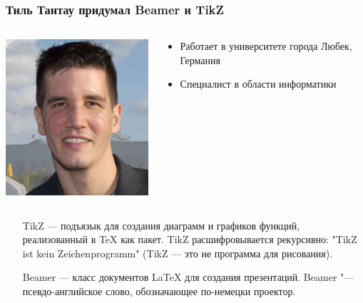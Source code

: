 \documentclass[10pt,pdf,hyperref={unicode}]{beamer}
\begin{document}
\begin{frame}
    \frametitle{Тиль Тантау придумал Beamer и TikZ}
    \begin{columns}[c]
        \begin{column}{0.5\textwidth}
            \includegraphics[keepaspectratio,height=0.5\textheight]{till_tantau.jpg}
        \end{column}
        \begin{column}{0.5\textwidth}
            \begin{itemize}
                \item Работает в университете города Любек, Германия
                \item Специалист в области информатики  
            \end{itemize}
        \end{column}
    \end{columns}
    \vfill
    \begin{itemize}
        \item[TikZ] --- подъязык для создания диаграмм и графиков функций, реализованный в \TeX{} как пакет. TikZ расшифровывается рекурсивно: "TikZ ist kein Zeichenprogramm"  (TikZ --- это не программа для рисования).
        \item[Beamer] --- класс документов \LaTeX{} для создания презентаций. Beamer "--- псевдо-английское слово, обозначающее по-немецки проектор. 
    \end{itemize}    
\end{frame}
\end{document}
